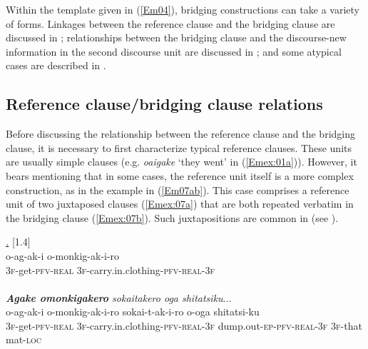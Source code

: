 \documentclass[output=paper]{LSP/langsci}
\begin{document}
%
Within the template given in (\ref{Em04}), bridging constructions can take a variety of forms. Linkages between the reference clause and the bridging clause are discussed in ; relationships between the bridging clause and the discourse-new information in the second discourse unit are discussed in ; and some atypical cases are described in .
%
\subsection{Reference clause/bridging clause relations}
\label{Emrelations}
Before discussing the relationship between the reference clause and the bridging clause, it is necessary to first characterize typical reference clauses. These units are usually simple clauses (e.g. \textit{oaigake} `they went' in (\ref{Emex:01a})). However, it bears mentioning that in some cases, the reference unit itself is a more complex construction, as in the example in (\ref{Em07ab}). This case comprises a reference unit of two juxtaposed clauses (\ref{Emex:07a}) that are both repeated verbatim in the bridging clause (\ref{Emex:07b}). Such juxtapositions are common in  (see ).
 
\begin{exe}
\ex \label{Em07ab}
\begin{xlist}
\ex \label{Emex:07a}
\glt \textit{\underline{.}} [1.4]\\
\gll o-ag-ak-i o-monkig-ak-i-ro \\
 \textsc{3f-}get\textsc{-pfv-real} \textsc{3f-}carry.in.clothing\textsc{-pfv-real-3f}\\
\glt {}\\
\ex \label{Emex:07b}
\glt \textit{\textbf{Agake omonkigakero} sokaitakero oga shitatsiku}...\\
\gll o-ag-ak-i o-monkig-ak-i-ro sokai-t-ak-i-ro o-oga shitatsi-ku\\     	      
   \textsc{3f-}get\textsc{-pfv-real} \textsc{3f-}carry.in.clothing\textsc{-pfv-real-3f} dump.out\textsc{-ep-pfv-real-3f} \textsc{3f-}that mat\textsc{-loc}\\
\glt {}
\end{xlist}
\end{exe}
\end{document}
